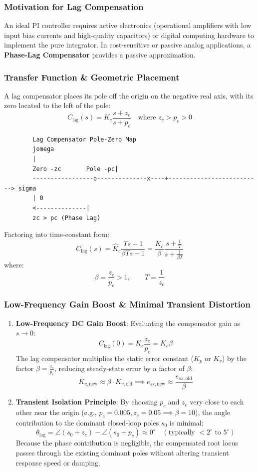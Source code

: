 \documentclass[12pt,onecolumn,twoside ]{article}
\begin{document}
	\subsubsection{Motivation for Lag Compensation}
	An ideal PI controller requires active electronics (operational amplifiers with low input bias currents and high-quality capacitors) or digital computing hardware to implement the pure integrator. In cost-sensitive or passive analog applications, a \textbf{Phase-Lag Compensator} provides a passive approximation.
	\subsubsection{Transfer Function \& Geometric Placement}
	A lag compensator places its pole off the origin on the negative real axis, with its zero located to the left of the pole: \[
	C_{\text{lag}}(s) = K_c \frac{s + z_c}{s + p_c} \quad \text{where } z_c > p_c > 0
	\]
	\begin{lstlisting}
		Lag Compensator Pole-Zero Map
		jomega
		|
		Zero -zc       Pole -pc|
		-----------------o--------------x----+--------------------------> sigma
		| 0
		<--------------|
		zc > pc (Phase Lag)
	\end{lstlisting}
	Factoring into time-constant form: \[
	C_{\text{lag}}(s) = \hat{K}_c \frac{T s + 1}{\beta T s + 1} = \frac{K_c}{\beta} \frac{s + \frac{1}{T}}{s + \frac{1}{\beta T}}
	\] where: \[
	\beta = \frac{z_c}{p_c} > 1, \qquad T = \frac{1}{z_c}
	\]
	\subsubsection{Low-Frequency Gain Boost \& Minimal Transient Distortion}
	\begin{enumerate}
		\item
		\textbf{Low-Frequency DC Gain Boost}: Evaluating the compensator gain as $s \to 0$: \[
		C_{\text{lag}}(0) = K_c \frac{z_c}{p_c} = K_c \beta
		\] The lag compensator multiplies the static error constant ($K_p$ or $K_v$) by the factor $\beta = \frac{z_c}{p_c}$, reducing steady-state error by a factor of $\beta$: \[
		K_{v,\text{new}} \approx \beta \cdot K_{v,\text{old}} \implies e_{ss,\text{new}} \approx \frac{e_{ss,\text{old}}}{\beta}
		\]
		\item
		\textbf{Transient Isolation Principle}: By choosing $p_c$ and $z_c$ very close to each other near the origin (e.g., $p_c = 0.005, z_c = 0.05 \implies \beta = 10$), the angle contribution to the dominant closed-loop poles $s_0$ is minimal: \[
		\theta_{\text{lag}} = \angle(s_0 + z_c) - \angle(s_0 + p_c) \approx 0^\circ \quad (\text{typically } < 2^\circ \text{ to } 5^\circ)
		\] Because the phase contribution is negligible, the compensated root locus passes through the existing dominant poles without altering transient response speed or damping.
	\end{enumerate}
	
\end{document}
